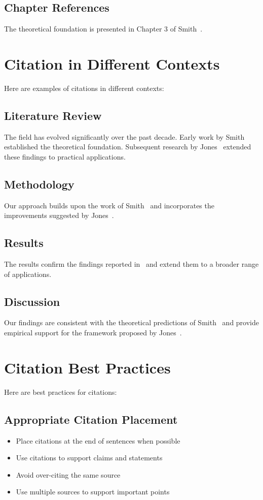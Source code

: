 \documentclass{article}
\begin{document}
\subsection{Chapter References}
The theoretical foundation is presented in Chapter 3 of Smith~\cite[Chapter 3]{smith2023}.

\section{Citation in Different Contexts}
Here are examples of citations in different contexts:

\subsection{Literature Review}
The field has evolved significantly over the past decade. Early work by Smith~\cite{smith2023} established the theoretical foundation. Subsequent research by Jones~\cite{jones2022} extended these findings to practical applications.

\subsection{Methodology}
Our approach builds upon the work of Smith~\cite{smith2023} and incorporates the improvements suggested by Jones~\cite{jones2022}.

\subsection{Results}
The results confirm the findings reported in~\cite{doe2023} and extend them to a broader range of applications.

\subsection{Discussion}
Our findings are consistent with the theoretical predictions of Smith~\cite{smith2023} and provide empirical support for the framework proposed by Jones~\cite{jones2022}.

\section{Citation Best Practices}
Here are best practices for citations:

\subsection{Appropriate Citation Placement}
\begin{itemize}
    \item Place citations at the end of sentences when possible
    \item Use citations to support claims and statements
    \item Avoid over-citing the same source
    \item Use multiple sources to support important points
\end{itemize}
\end{document}
